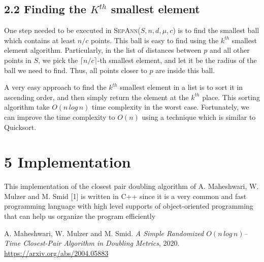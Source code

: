 \documentclass[12pt,english,]{article}
\begin{document}
\hypertarget{finding-the-kth-smallest-element}{%
\subsection{\texorpdfstring{2.2 \enspace Finding the \(K^{th}\) smallest
element}{2.2 Finding the K\^{}\{th\} smallest element}}\label{finding-the-kth-smallest-element}}

One step needed to be executed in \textsc{SepAnn($S,n,d,\mu,c$)} is to
find the smallest ball which contains at least \(n/c\) points. This ball
is easy to find using the \(k^{th}\) smallest element algorithm.
Particularly, in the list of distances between \(p\) and all other
points in \(S\), we pick the \(\lceil n/c\rceil\)-th smallest element,
and let it be the radius of the ball we need to find. Thus, all points
closer to \(p\) are inside this ball.

A very easy approach to find the \(k^{th}\) smallest element in a list
is to sort it in ascending order, and then simply return the element at
the \(k^{th}\) place. This sorting algorithm take \(O(n\,log\,n)\) time
complexity in the worst case. Fortunately, we can improve the time
complexity to \(O(n)\) using a technique which is similar to Quicksort.

\hypertarget{implementation}{%
\section{\texorpdfstring{5
\enspace Implementation}{5 Implementation}}\label{implementation}}

This implementation of the closest pair doubling algorithm of A.
Maheshwari, W. Mulzer and M. Smid {[}1{]} is written in C++ since it is
a very common and fast programming language with high level supports of
object-oriented programming that can help us organize the program
efficiently

\medskip

\begin{thebibliography}{9}
A. Maheshwari, W. Mulzer and M. Smid. \emph{A Simple Randomized $O(n\,log\,n)$–Time Closest-Pair Algorithm in Doubling Metrics}, 2020. \url{https://arxiv.org/abs/2004.05883}
\end{thebibliography}
\end{document}
